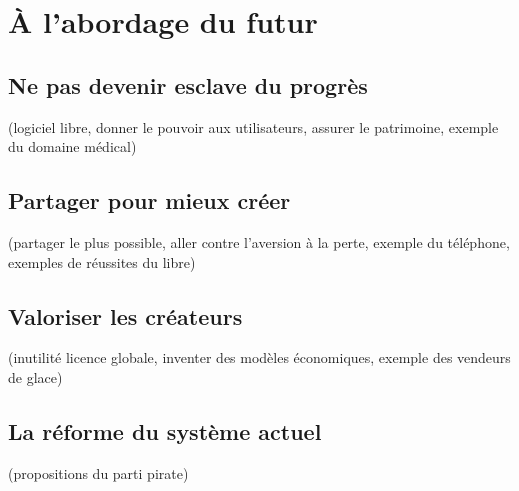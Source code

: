 \chapter{À l'abordage du futur}

\section{Ne pas devenir esclave du progrès}
(logiciel libre, donner le pouvoir aux utilisateurs, assurer le patrimoine, exemple du domaine médical)
\section{Partager pour mieux créer}
(partager le plus possible, aller contre l'aversion à la perte, exemple du téléphone, exemples de réussites du libre)
\section{Valoriser les créateurs}
(inutilité licence globale, inventer des modèles économiques, exemple des vendeurs de glace)
\section{La réforme du système actuel}
(propositions du parti pirate)
